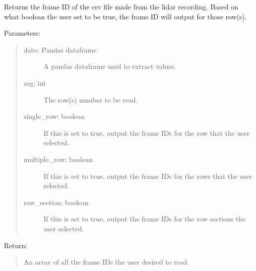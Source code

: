 \documentclass[letterpaper,10pt,english]{sphinxmanual}
\begin{document}

\begin{fulllineitems}
\label{\detokenize{Lidar extraction tool:lidar_extract.get_frame_id}}
Returns the frame ID of the csv file made from the lidar recording. Based on what boolean the user set to be true,
the frame ID will output for those row(s).

Parameters:
\begin{quote}
\begin{description}
\item[{data: Pandas dataframe}] \leavevmode
A pandas dataframe used to extract values.

\item[{arg: int}] \leavevmode
The row(s) number to be read.

\item[{single\_row: boolean}] \leavevmode
If this is set to true, output the frame IDs for the row that the user selected.

\item[{multiple\_row: boolean}] \leavevmode
If this is set to true, output the frame IDs for the rows that the user selected.

\item[{row\_section: boolean}] \leavevmode
If this is set to true, output the frame IDs for the row sections the user selected.

\end{description}
\end{quote}

Return:
\begin{quote}

An array of all the frame IDs the user desired to read.
\end{quote}

\end{fulllineitems}

\end{document}
